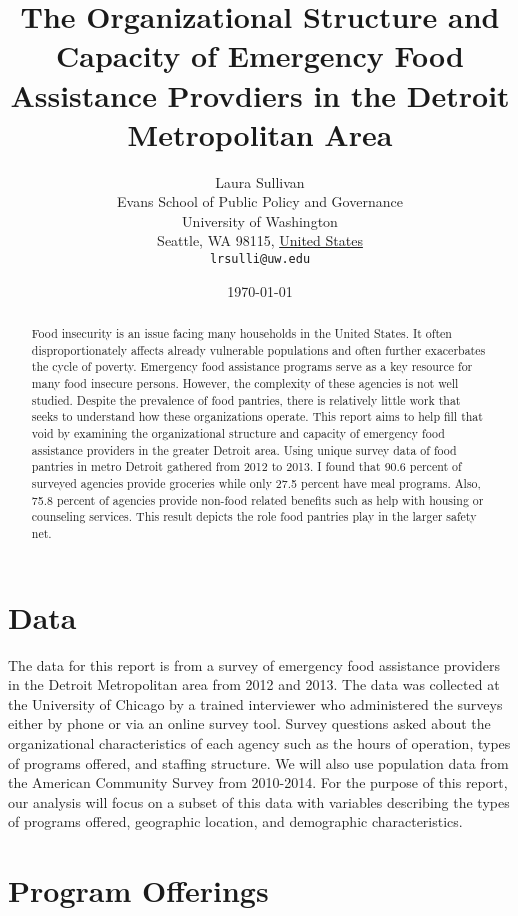 \documentclass[11pt]{article}
\title{The Organizational Structure and Capacity of Emergency Food Assistance Provdiers in the Detroit Metropolitan Area}
\author{
        Laura Sullivan\\
        Evans School of Public Policy and Governance\\
        University of Washington\\
        Seattle, WA 98115, \underline{United States}\\
        \texttt{lrsulli@uw.edu}
}
\date{\today}
\begin{document}


\maketitle


\begin{abstract}
Food insecurity is an issue facing many households in the United States. It often disproportionately affects already vulnerable populations and often further exacerbates the cycle of poverty. Emergency food assistance programs serve as a key resource for many food insecure persons. However, the complexity of these agencies is not well studied. Despite the prevalence of food pantries, there is relatively little work that seeks to understand how these organizations operate. This report aims to help fill that void by examining the organizational structure and capacity of emergency food assistance providers in the greater Detroit area. Using unique survey data of food pantries in metro Detroit gathered from 2012 to 2013. I found that 90.6 percent of surveyed agencies provide groceries while only 27.5 percent have meal programs. Also, 75.8 percent of agencies provide non-food related benefits such as help with housing or counseling services. This result depicts the role food pantries play in the larger safety net.
\end{abstract}

\section{Data}\label{intro}
The data for this report is from a survey of emergency food assistance providers in the Detroit Metropolitan area from 2012 and 2013. The data was collected at the University of Chicago by a trained interviewer who administered the surveys either by phone or via an online survey tool. Survey questions asked about the organizational characteristics of each agency such as the hours of operation, types of programs offered, and staffing structure. We will also use population data from the American Community Survey from 2010-2014. For the purpose of this report, our analysis will focus on a subset of this data with variables describing the types of programs offered, geographic location, and demographic characteristics.


\section{Program Offerings}\label{outline}
\end{document}
